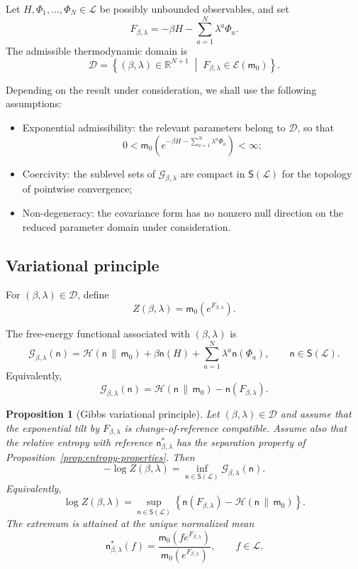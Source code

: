 \documentclass[11pt,reqno]{amsart}
\newtheorem{Proposition}[Theorem]{Proposition}
\begin{document}
Let $H,\Phi_1,\ldots,\Phi_N\in\mathcal L$ be possibly unbounded
observables, and set
\[
F_{\beta,\lambda}
=
-\beta H-\sum_{a=1}^{N}\lambda^a\Phi_a.
\]
The admissible thermodynamic domain is
\[
\mathcal D
=
\left\{
(\beta,\lambda)\in\mathbb R^{N+1}
\;\middle|\;
F_{\beta,\lambda}\in\mathcal E(\mathsf m_0)
\right\}.
\]

Depending on the result under consideration, we shall use the following
assumptions:

\begin{itemize}
\item[(A1)] Exponential admissibility: the relevant parameters belong
to $\mathcal D$, so that
\[
0<
\mathsf m_0\left(
e^{-\beta H-\sum_{a=1}^{N}\lambda^a\Phi_a}
\right)
<\infty;
\]

\item[(A2)] Coercivity: the sublevel sets of
$\mathcal G_{\beta,\lambda}$ are compact in
$\mathsf S(\mathcal L)$ for the topology of pointwise convergence;

\item[(A3)] Non-degeneracy: the covariance form has no nonzero null
direction on the reduced parameter domain under consideration.
\end{itemize}

\subsection{Variational principle}

For $(\beta,\lambda)\in\mathcal D$, define
\[
Z(\beta,\lambda)
=
\mathsf m_0\left(e^{F_{\beta,\lambda}}\right).
\]

The free-energy functional associated with $(\beta,\lambda)$ is
\[
\mathcal G_{\beta,\lambda}(\mathsf n)
=
\mathcal H(\mathsf n\,\|\,\mathsf m_0)
+
\beta\mathsf n(H)
+
\sum_{a=1}^{N}\lambda^a\mathsf n(\Phi_a),
\qquad
\mathsf n\in\mathsf S(\mathcal L).
\]
Equivalently,
\[
\mathcal G_{\beta,\lambda}(\mathsf n)
=
\mathcal H(\mathsf n\,\|\,\mathsf m_0)
-
\mathsf n(F_{\beta,\lambda}).
\]

\begin{Proposition}[Gibbs variational principle]
\label{prop:gibbs-variational-principle}
Let $(\beta,\lambda)\in\mathcal D$ and assume that the exponential tilt
by $F_{\beta,\lambda}$ is change-of-reference compatible. Assume also
that the relative entropy with reference
$\mathsf n_{\beta,\lambda}^*$ has the separation property of
Proposition~\ref{prop:entropy-properties}. Then
\[
-\log Z(\beta,\lambda)
=
\inf_{\mathsf n\in\mathsf S(\mathcal L)}
\mathcal G_{\beta,\lambda}(\mathsf n).
\]
Equivalently,
\[
\log Z(\beta,\lambda)
=
\sup_{\mathsf n\in\mathsf S(\mathcal L)}
\left\{
\mathsf n(F_{\beta,\lambda})
-
\mathcal H(\mathsf n\,\|\,\mathsf m_0)
\right\}.
\]
The extremum is attained at the unique normalized mean
\[
\mathsf n_{\beta,\lambda}^{*}(f)
=
\frac{
\mathsf m_0\left(fe^{F_{\beta,\lambda}}\right)
}{
\mathsf m_0\left(e^{F_{\beta,\lambda}}\right)
},
\qquad
f\in\mathcal L.
\]
\end{Proposition}
\end{document}
